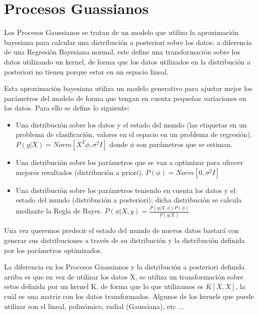 \chapter{Procesos Guassianos}
Los Procesos Gaussianos se tratan de un modelo que utiliza la aproximación bayesiana para calcular una distribución a posteriori sobre los datos; a diferencia de una Regresión Bayesiana normal, este define una transformación sobre los datos utilizando un kernel, de forma que los datos utilizados en la distribución a posteriori no tienen porque estar en un espacio lineal.\newline

Esta aproximación bayesiana utiliza un modelo generativo para ajustar mejor los parámetros del modelo de forma que tengan en cuenta pequeñas variaciones en los datos. Para ello se define lo siguiente:
\begin{itemize}
	\item Una distribución sobre los datos y el estado del mundo (las etiquetas en un problema de clasificación, valores en el espacio en un problema de regresión). $ P(y|X) = Norm[X^T\phi,\sigma^2I] $ donde $\phi$ son parámetros que se estiman.
	\item Una distribución sobre los parámetros que se van a optimizar para ofrecer mejores resultados (distribución a priori). $ P(\phi) = Norm[0,\sigma^2I]$
	\item Una distribución sobre los parámetros teniendo en cuenta los datos y el estado del mundo (distribución a posteriori); dicha distribución se calcula mediante la Regla de Bayes. $ P(\phi|X,y) = \frac{P(y|X,\phi) P(\phi) }{P(y|X)}$
\end{itemize}

Una vez queremos predecir el estado del mundo de nuevos datos bastará con generar sus distribuciones a través de su distribución y la distribución definida por los parámetros optimizados.\newline 

La diferencia en los Procesos Guassianos y la distribución a posteriori definida arriba es que en vez de utilizar los datos X, se utiliza un transformación sobre estos definida por un kernel K, de forma que lo que utilizamos es $ K[X,X] $, la cuál es una matriz con los datos transformados. Algunos de los kernels que puede utilizar son el lineal, polinómico, radial (Gaussiana), etc ...